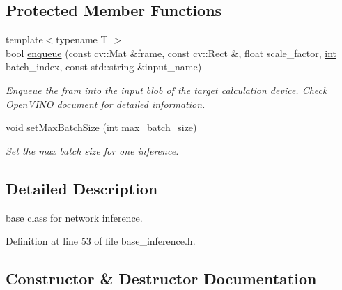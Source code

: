 \subsection*{Protected Member Functions}
\begin{DoxyCompactItemize}
\item 
{\footnotesize template$<$typename T $>$ }\\bool \hyperlink{classopenvino__service_1_1BaseInference_a11acca6926bf1ed6a23f53ca76673715}{enqueue} (const cv\+::\+Mat \&frame, const cv\+::\+Rect \&, float scale\+\_\+factor, \hyperlink{CMakeCache_8txt_a79a3d8790b2588b09777910863574e09}{int} batch\+\_\+index, const std\+::string \&input\+\_\+name)
\begin{DoxyCompactList}\small\item\em Enqueue the fram into the input blob of the target calculation device. Check Open\+V\+I\+NO document for detailed information. \end{DoxyCompactList}\item 
void \hyperlink{classopenvino__service_1_1BaseInference_a5fde37567347eb98309a530c22335a76}{set\+Max\+Batch\+Size} (\hyperlink{CMakeCache_8txt_a79a3d8790b2588b09777910863574e09}{int} max\+\_\+batch\+\_\+size)
\begin{DoxyCompactList}\small\item\em Set the max batch size for one inference. \end{DoxyCompactList}\end{DoxyCompactItemize}


\subsection{Detailed Description}
base class for network inference. 

Definition at line 53 of file base\+\_\+inference.\+h.



\subsection{Constructor \& Destructor Documentation}
